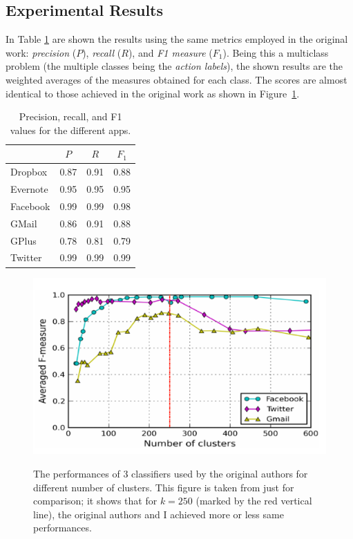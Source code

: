 \subsection{Experimental Results}
In Table \ref{tab:results} are shown the results using the same metrics employed in the original work: \textit{precision} ($P$), \textit{recall} ($R$), and \textit{F1 measure} ($F_1$). Being this a multiclass problem (the multiple classes being the \textit{action labels}), the shown results are the weighted averages of the measures obtained for each class. The scores are almost identical to those achieved in the original work as shown in Figure~\ref{fig:original}. 

\begin{table}[h]
\centering
\begin{tabular}{l|ccc}
\hline
         & $P$ & $R$ & $F_1$ \\ \hline
Dropbox  & 0.87    &  0.91   &    0.88   \\
Evernote & 0.95   &  0.95   &    0.95   \\
Facebook &  0.99   &  0.99   &  0.98     \\
GMail    &   0.86  &   0.91  &   0.88    \\
GPlus    &  0.78   &  0.81   &   0.79    \\
Twitter  &  0.99   &  0.99   &   0.99    \\ \hline
\end{tabular}
\caption{Precision, recall, and F1 values for the different apps. }
\label{tab:results}
\end{table}

\begin{figure}[h]
\centering
\includegraphics[scale=0.5]{images/fig10}
  \label{fig:sfig1}
\caption{The performances of 3 classifiers used by the original authors for different number of clusters. This figure is taken from \cite{contiknocking} just for comparison; it shows that for $k=250$ (marked by the red vertical line), the original authors and I achieved more or less same performances.}
\label{fig:original}
\end{figure}

